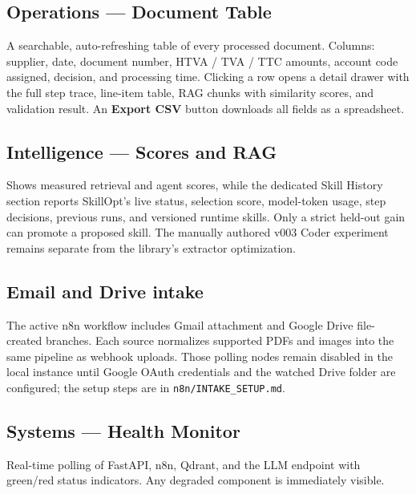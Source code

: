 \subsection{Operations — Document Table}

A searchable, auto-refreshing table of every processed document. Columns:
supplier, date, document number, HTVA / TVA / TTC amounts, account code assigned,
decision, and processing time. Clicking a row opens a detail drawer with the full
step trace, line-item table, RAG chunks with similarity scores, and validation
result. An \textbf{Export CSV} button downloads all fields as a spreadsheet.

\subsection{Intelligence — Scores and RAG}

Shows measured retrieval and agent scores, while the dedicated Skill History
section reports SkillOpt's live status, selection score, model-token usage,
step decisions, previous runs, and versioned runtime skills. Only a strict
held-out gain can promote a proposed skill. The manually authored v003 Coder
experiment remains separate from the library's extractor optimization.

\subsection{Email and Drive intake}

The active n8n workflow includes Gmail attachment and Google Drive file-created
branches. Each source normalizes supported PDFs and images into the same
pipeline as webhook uploads. Those polling nodes remain disabled in the local
instance until Google OAuth credentials and the watched Drive folder are
configured; the setup steps are in \texttt{n8n/INTAKE\_SETUP.md}.

\subsection{Systems — Health Monitor}

Real-time polling of FastAPI, n8n, Qdrant, and the LLM endpoint with green/red
status indicators. Any degraded component is immediately visible.
